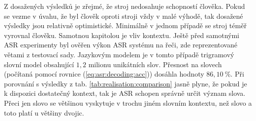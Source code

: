 Z dosažených výsledků je zřejmé, že stroj nedosahuje schopností člověka. Pokud se vezme v úvahu, že byl člověk oproti stroji vždy v malé výhodě, tak dosažené výsledky jsou relativně optimistické. Minimálně v jednom případě se stroj téměř vyrovnal člověku. Samotnou kapitolou je vliv kontextu. Ještě před samotnými ASR experimenty byl ověřen výkon ASR systému na  řeči, zde reprezentované větami z testovací sady. Jazykovým modelem je v tomto případě trigramový slovní model obsahující $1,2$ milionu unikátních slov. Přesnost na slovech (počítaná pomocí rovnice (\ref{eq:asr:decoding:acc})) dosáhla hodnoty $86,10\ \%$. Při porovnání s výsledky z tab. \ref{tab:realisation:comparison} jasně plyne, že pokud je k dispozici dostatečný kontext, tak je ASR schopen správně určit význam slova. Přeci jen slovo  se většinou vyskytuje v trochu jiném slovním kontextu, než slovo  a toto platí u většiny dvojic.

